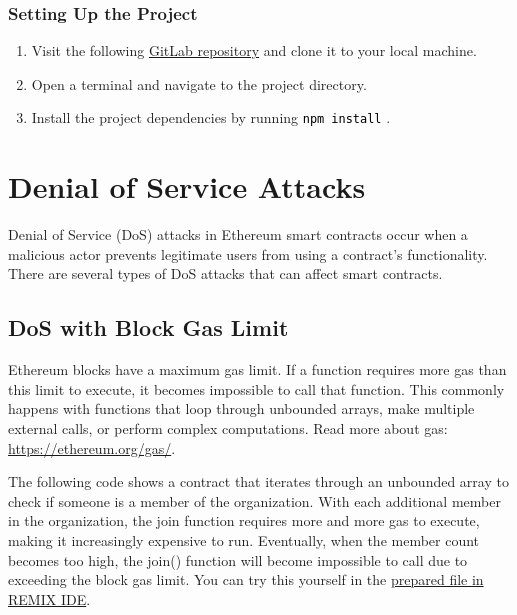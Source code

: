 \documentclass[12pt]{article}
\newcommand{\codegrey}[1]{%
  \texttt{\colorbox{black!4}{\textcolor{black}{#1}}}%
}
\begin{document}
\subsubsection*{Setting Up the Project}

\begin{enumerate}
    \item Visit the following
          \href{https://gitlab.fel.cvut.cz/radovluk/smart-contracts-exercises/-/tree/main/07-Out-of-Gas/task/task-code}{GitLab
              repository} and clone it to your local machine.
    \item Open a terminal and navigate to the project directory.
    \item Install the project dependencies by running \codegrey{npm install}.
\end{enumerate}

\section{Denial of Service Attacks}

Denial of Service (DoS) attacks in Ethereum smart contracts occur when a
malicious actor prevents legitimate users from using a contract's
functionality. There are several types of DoS attacks that can affect smart
contracts.

\subsection{DoS with Block Gas Limit}

Ethereum blocks have a maximum gas limit. If a function requires more gas than
this limit to execute, it becomes impossible to call that function. This commonly happens
with functions that loop through unbounded arrays, make multiple external
calls, or perform complex computations. Read more about gas:
\href{https://ethereum.org/gas/}{https://ethereum.org/gas/}.

The following code shows a contract that iterates through an unbounded array to
check if someone is a member of the organization. With each additional member
in the organization, the join function requires more and more gas to execute,
making it increasingly expensive to run. Eventually, when the member count
becomes too high, the join() function will become impossible to call due
to exceeding the block gas limit. You can try this yourself in the
\href{https://remix.ethereum.org/?#activate=solidity&url=https://github.com/radovluk/unbreakable-vault/contracts/DoS01.sol&lang=en&optimize=false&runs=200&evmVersion=null&version=soljson-v0.8.28+commit.7893614a.js}{prepared
    file in REMIX IDE}.
\end{document}
